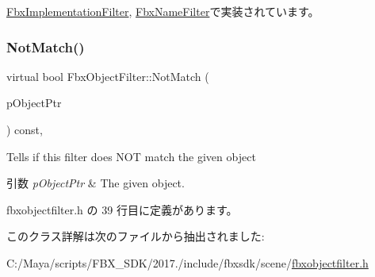 \hyperlink{class_fbx_implementation_filter_a59ab32592ea71f1853f1cc5f641a341d}{Fbx\+Implementation\+Filter}, \hyperlink{class_fbx_name_filter_a2767c75f626baed7800308f937302743}{Fbx\+Name\+Filter}で実装されています。

\mbox{\label{class_fbx_object_filter_a1920c73e0044a43ae151175d788e7674}} 
\subsubsection{\texorpdfstring{Not\+Match()}{NotMatch()}}
{\footnotesize\ttfamily virtual bool Fbx\+Object\+Filter\+::\+Not\+Match (\begin{DoxyParamCaption}\item[{const \hyperlink{class_fbx_object}{Fbx\+Object} $\ast$}]{p\+Object\+Ptr }\end{DoxyParamCaption}) const\hspace{0.3cm}{\ttfamily [inline]}, {\ttfamily [virtual]}}

Tells if this filter does N\+OT match the given object 
\begin{DoxyParams}{引数}
{\em p\+Object\+Ptr} & The given object. \\
\hline
\end{DoxyParams}


 fbxobjectfilter.\+h の 39 行目に定義があります。



このクラス詳解は次のファイルから抽出されました\+:\begin{DoxyCompactItemize}
\item 
C\+:/\+Maya/scripts/\+F\+B\+X\+\_\+\+S\+D\+K/2017./include/fbxsdk/scene/\hyperlink{fbxobjectfilter_8h}{fbxobjectfilter.\+h}\end{DoxyCompactItemize}
